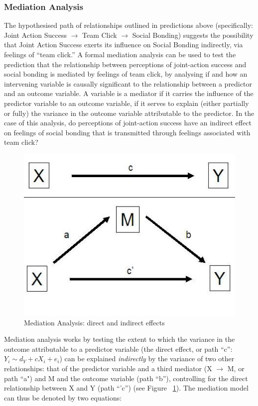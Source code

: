 \subsubsection{Mediation Analysis}
The hypothesised path of relationships outlined in predictions above (specifically: Joint Action Success $\rightarrow$ Team Click $\rightarrow$ Social Bonding) suggests the possibility that Joint Action Success exerts its influence on Social Bonding indirectly, via feelings of ``team click.''  A formal mediation analysis can be used to test the prediction that the relationship between perceptions of joint-action success and social bonding is mediated by feelings of team click, by analysing if and how an intervening variable is causally significant to the relationship between a predictor and an outcome variable. A variable is a mediator if it carries the influence of the predictor variable to an outcome variable, if it serves to explain (either partially or fully) the variance in the outcome variable attributable to the predictor. In the case of this analysis, do perceptions of joint-action success have an indirect effect on feelings of social bonding that is transmitted through feelings associated with team click?

\begin{figure}[htbp]
  \begin{center}
    \includegraphics[scale = .5]{images/mediation_image.jpg}
    \caption{Mediation Analysis: direct and indirect effects}
    \label{fig:mediationAnalysis}
  \end{center}
\end{figure}

Mediation analysis works by testing the extent to which the variance in the outcome attributable to a predictor variable (the direct effect, or path ``c'': $Y_i \sim d_Y + cX_i + e_i$) can be explained \textit{indirectly} by the variance of two other relationships: that of the predictor variable and a third mediator (X $\rightarrow$ M, or path ``a")  and M and the outcome variable (path ``b''), controlling for the direct relationship between X and Y (path ``'c'') (see Figure ~\ref{fig:mediationAnalysis}). The mediation model can thus be denoted by two equations:

